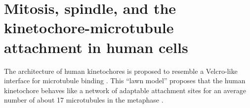 \section{Mitosis, spindle, and the kinetochore-microtubule attachment in human cells}


The architecture of human kinetochores is proposed to resemble a Velcro-like interface for microtubule binding \cite{Velcro}. This ``lawn model'' proposes that the human kinetochore behaves like a network of adaptable attachment sites for an average number of about 17 microtubules in the metaphase \cite{Wendell1993, Zaytsev2014, Zaytsev2015, Kukreja2020}.




